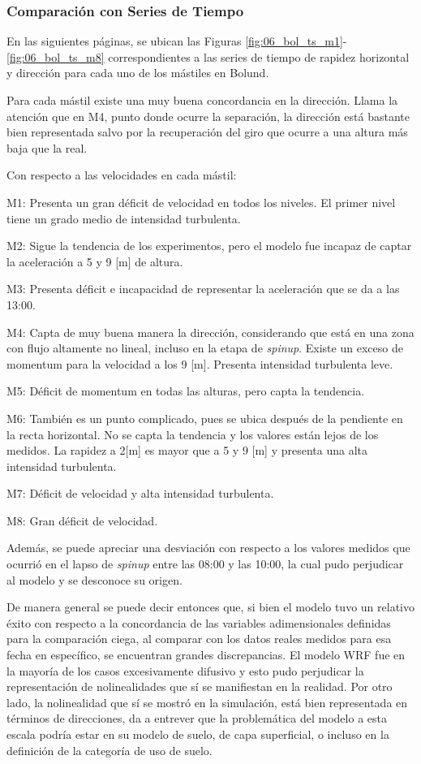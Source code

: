 \subsubsection{Comparación con Series de Tiempo}
En las siguientes páginas, se ubican las Figuras \ref{fig:06_bol_ts_m1}-\ref{fig:06_bol_ts_m8} correspondientes a las series de tiempo de rapidez horizontal y dirección para cada uno de los mástiles en Bolund. 

Para cada mástil existe una muy buena concordancia en la dirección. Llama la atención que en M4, punto donde ocurre la separación, la dirección está bastante bien representada salvo por la recuperación del giro que ocurre a una altura más baja que la real. 

Con respecto a las velocidades en cada mástil:
\begin{itemize*}
	\item M1: Presenta un gran déficit de velocidad en todos los niveles. El primer nivel tiene un grado medio de intensidad turbulenta.
	\item M2: Sigue la tendencia de los experimentos, pero el modelo fue incapaz de captar la aceleración a 5 y 9 [m] de altura.
	\item M3: Presenta déficit e incapacidad de representar la aceleración que se da a las 13:00.
	\item M4: Capta de muy buena manera la dirección, considerando que está en una zona con flujo altamente no lineal, incluso en la etapa de \emph{spinup}. Existe un exceso de momentum para la velocidad a los 9 [m]. Presenta intensidad turbulenta leve.
	\item M5: Déficit de momentum en todas las alturas, pero capta la tendencia.
	\item M6: También es un punto complicado, pues se ubica después de la pendiente en la recta horizontal. No se capta la tendencia y los valores están lejos de los medidos. La rapidez a 2[m] es mayor que a 5 y 9 [m] y presenta una alta intensidad turbulenta.
	\item M7: Déficit de velocidad y alta intensidad turbulenta.
	\item M8: Gran déficit de velocidad.
\end{itemize*} 

Además, se puede apreciar una desviación con respecto a los valores medidos que ocurrió en el lapso de \emph{spinup} entre las 08:00 y las 10:00, la cual pudo perjudicar al modelo y se desconoce su origen.

De manera general se puede decir entonces que, si bien el modelo tuvo un relativo éxito con respecto a la concordancia de las variables adimensionales definidas para la comparación ciega, al comparar con los datos reales medidos para esa fecha en específico, se encuentran grandes discrepancias. El modelo WRF fue en la mayoría de los casos excesivamente difusivo y esto pudo perjudicar la representación de nolinealidades que sí se manifiestan en la realidad. Por otro lado, la nolinealidad que sí se mostró en la simulación, está bien representada en términos de direcciones, da a entrever que la problemática del modelo a esta escala podría estar en su modelo de suelo, de capa superficial, o incluso en la definición de la categoría de uso de suelo.

